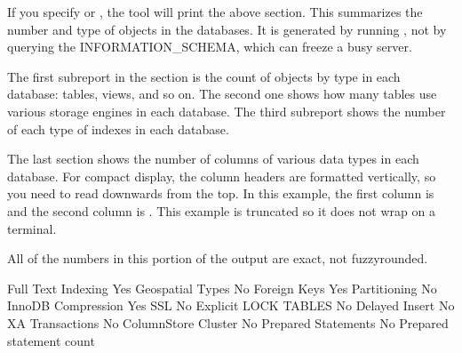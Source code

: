 \documentclass[letterpaper,10pt,english]{sphinxmanual}
\begin{document}
\sphinxAtStartPar
If you specify {\hyperref[\detokenize{mariadb-database-summary:cmdoption-mariadb-database-summary-databases}]{}} or {\hyperref[\detokenize{mariadb-database-summary:cmdoption-mariadb-database-summary-all-databases}]{}}, the tool will print
the above section. This summarizes the number and type of objects in the
databases. It is generated by running , not by querying
the INFORMATION\_SCHEMA, which can freeze a busy server.

\sphinxAtStartPar
The first sub\sphinxhyphen{}report in the section is the count of objects by type in each
database: tables, views, and so on. The second one shows how many tables use
various storage engines in each database. The third sub\sphinxhyphen{}report shows the number
of each type of indexes in each database.

\sphinxAtStartPar
The last section shows the number of columns of various data types in each
database. For compact display, the column headers are formatted vertically, so
you need to read downwards from the top. In this example, the first column is
 and the second column is . This example is truncated so it
does not wrap on a terminal.

\sphinxAtStartPar
All of the numbers in this portion of the output are exact, not fuzzy\sphinxhyphen{}rounded.

\begin{sphinxVerbatim}[commandchars=\\\{\}]
       Full Text Indexing  Yes
         Geospatial Types  No
             Foreign Keys  Yes
             Partitioning  No
       InnoDB Compression  Yes
                      SSL  No
     Explicit LOCK TABLES  No
           Delayed Insert  No
          XA Transactions  No
      ColumnStore Cluster  No
      Prepared Statements  No
 Prepared statement count  
\end{sphinxVerbatim}
\end{document}
